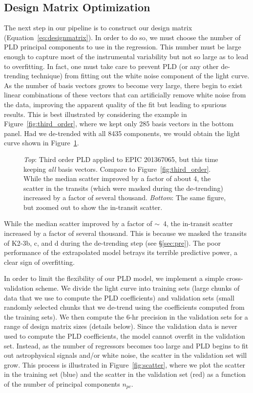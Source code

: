 \documentclass[]{emulateapj}
\begin{document}
\subsection{Design Matrix Optimization}
\label{sec:dmopt}
The next step in our pipeline is to construct our design matrix 
(Equation~\ref{eq:designmatrix}). In order to do so, we must choose the
number of PLD principal components to use in the regression. This number must be
large enough to capture most of the instrumental variability
but not so large as to lead to overfitting. In fact, one must take care
to prevent PLD (or any other de-trending technique) from fitting out the white noise 
component of the light curve. As the number of basis vectors grows to become very large, 
there begin to exist linear combinations of these vectors that can artificially remove 
white noise from the data, improving the apparent quality of the fit but leading to spurious 
results. This is best illustrated by considering the example in Figure~\ref{fig:third_order}, 
where we kept only 285 basis vectors in the bottom panel. Had we de-trended with all 
8435 components, we would obtain the light curve shown in Figure~\ref{fig:overfitting}.
\begin{figure}[h]
  \begin{center}
       \caption{\emph{Top}: Third order PLD applied to EPIC 201367065, but this time keeping 
                \emph{all} basis vectors. Compare to 
                Figure~\ref{fig:third_order}. While the median scatter improved by a factor
                of about 4, the scatter in the transits (which were masked during the de-trending)
                increased by a factor of several thousand. \emph{Bottom}: The same figure, 
                but zoomed out to show the in-transit scatter.}
     \label{fig:overfitting}
  \end{center}
\end{figure}
While the median scatter improved by a factor of $\sim$~4, the in-transit scatter increased
by a factor of several thousand. This is because we masked the transits of K2-3b,
c, and d during the de-trending step (see \S\ref{sec:pre}). The poor
performance of the extrapolated model betrays its terrible predictive power, a clear sign
of overfitting.

In order to limit the flexibility of our PLD model, we implement a simple cross-validation
scheme. We divide the light curve into training sets (large chunks of data that we use to compute the PLD
coefficients) and validation sets (small randomly selected chunks that we de-trend using the coefficients
computed from the training sets). We then compute the 6-hr precision in the validation
sets for a range of design matrix sizes (details below). Since the validation data is never used
to compute the PLD coefficients, the model cannot overfit in the validation set. Instead,
as the number of regressors becomes too large and PLD begins to fit out astrophysical
signals and/or white noise, the scatter in the validation set will grow.
This process is illustrated in Figure~\ref{fig:scatter}, where we plot the scatter in 
the training set (blue) and the scatter in the validation set (red) as a function of
the number of principal components $n_{pc}$.
\end{document}

